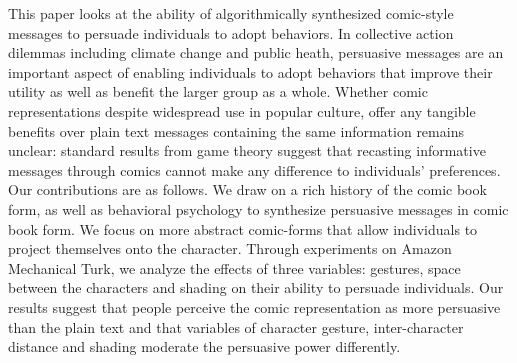 
This paper looks at the ability of algorithmically synthesized comic-style messages to persuade individuals to adopt behaviors. In collective action dilemmas including climate change and public heath, persuasive messages are an important aspect of enabling individuals to adopt behaviors that improve their utility as well as benefit the larger group as a whole. Whether comic representations despite widespread use in popular culture, offer any tangible benefits over plain text messages containing the same information remains unclear: standard results from game theory suggest that recasting informative messages through comics cannot make any difference to individuals’ preferences. Our contributions are as follows. We draw on a rich history of the comic book form, as well as behavioral psychology to synthesize persuasive messages in comic book form. We focus on more abstract comic-forms that allow individuals to project themselves onto the character. Through experiments on Amazon Mechanical Turk, we analyze the effects of three variables: gestures, space between the characters and shading on their ability to persuade individuals. Our results suggest that people perceive the comic representation as more persuasive than the plain text and that variables of character gesture, inter-character distance and shading moderate the persuasive power differently. 
